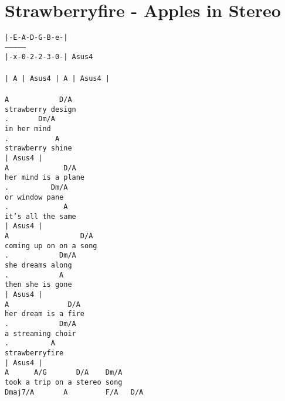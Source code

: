 \newpage
\section{Strawberryfire - Apples in Stereo}
\label{Strawberryfire - Apples in Stereo}
\texttt{|-E-A-D-G-B-e-|\\
---------------\\
|-x-0-2-2-3-0-| Asus4\ \\
\\
|\ A\ |\ Asus4\ |\ A\ |\ Asus4\ |\\
\\
A\ \ \ \ \ \ \ \ \ \ \ \ D/A\\
strawberry\ design\\
.\ \ \ \ \ \ \ Dm/A\\
in\ her\ mind\\
.\ \ \ \ \ \ \ \ \ \ \ A\ \\
strawberry\ shine\\
|\ Asus4\ |\\
A\ \ \ \ \ \ \ \ \ \ \ \ \ D/A\ \ \ \ \ \ \ \ \ \\
her\ mind\ is\ a\ plane\ \\
.\ \ \ \ \ \ \ \ \ \ Dm/A\\
or\ window\ pane\\
.\ \ \ \ \ \ \ \ \ \ \ \ \ A\\
it's\ all\ the\ same\\
|\ Asus4\ |\\
A\ \ \ \ \ \ \ \ \ \ \ \ \ \ \ \ \ D/A\\
coming\ up\ on\ on\ a\ song\\
.\ \ \ \ \ \ \ \ \ \ \ \ Dm/A\\
she\ dreams\ along\\
.\ \ \ \ \ \ \ \ \ \ \ \ A\\
then\ she\ is\ gone\\
|\ Asus4\ |\\
A\ \ \ \ \ \ \ \ \ \ \ \ \ \ D/A\\
her\ dream\ is\ a\ fire\\
.\ \ \ \ \ \ \ \ \ \ \ \ Dm/A\\
a\ streaming\ choir\\
.\ \ \ \ \ \ \ \ \ \ A\\
strawberryfire\\
|\ Asus4\ |\\
A\ \ \ \ \ \ A/G\ \ \ \ \ \ \ D/A\ \ \ \ Dm/A\\
took\ a\ trip\ on\ a\ stereo\ song\\
Dmaj7/A\ \ \ \ \ \ \ A\ \ \ \ \ \ \ \ \ F/A\ \ \ D/A\\
}
